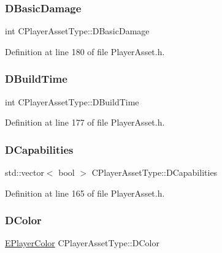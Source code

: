 \subsubsection{\texorpdfstring{D\+Basic\+Damage}{DBasicDamage}}
{\footnotesize\ttfamily int C\+Player\+Asset\+Type\+::\+D\+Basic\+Damage\hspace{0.3cm}{\ttfamily [protected]}}



Definition at line 180 of file Player\+Asset.\+h.

\hypertarget{classCPlayerAssetType_aa65de0691276352ebc3c3a9936a74278}{}\label{classCPlayerAssetType_aa65de0691276352ebc3c3a9936a74278} 
\subsubsection{\texorpdfstring{D\+Build\+Time}{DBuildTime}}
{\footnotesize\ttfamily int C\+Player\+Asset\+Type\+::\+D\+Build\+Time\hspace{0.3cm}{\ttfamily [protected]}}



Definition at line 177 of file Player\+Asset.\+h.

\hypertarget{classCPlayerAssetType_a243f9161c56446b378dc42b51977fc58}{}\label{classCPlayerAssetType_a243f9161c56446b378dc42b51977fc58} 
\subsubsection{\texorpdfstring{D\+Capabilities}{DCapabilities}}
{\footnotesize\ttfamily std\+::vector$<$ bool $>$ C\+Player\+Asset\+Type\+::\+D\+Capabilities\hspace{0.3cm}{\ttfamily [protected]}}



Definition at line 165 of file Player\+Asset.\+h.

\hypertarget{classCPlayerAssetType_abd32b27281bcf17a611802aef148462b}{}\label{classCPlayerAssetType_abd32b27281bcf17a611802aef148462b} 
\subsubsection{\texorpdfstring{D\+Color}{DColor}}
{\footnotesize\ttfamily \hyperlink{GameDataTypes_8h_aafb0ca75933357ff28a6d7efbdd7602f}{E\+Player\+Color} C\+Player\+Asset\+Type\+::\+D\+Color\hspace{0.3cm}{\ttfamily [protected]}}



